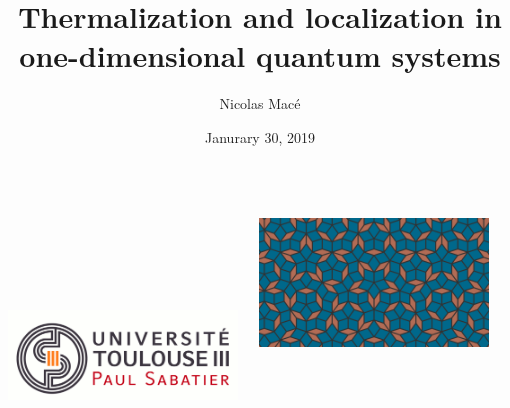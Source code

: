 \begin{frame}
\title{Thermalization and localization in one-dimensional quantum systems}

\author{Nicolas Macé}

\date{Janurary 30, 2019}

\titlepage

\btVFill
\begin{columns}
\begin{column}{2cm}
~\\
~\\
~\\
~\\
\raggedright
\includegraphics[scale=.15]{img/title/logo-ups.png}
\end{column}
\begin{column}{6cm}
\centering
\includegraphics[width=.8\textwidth]{img/title/cover.png}
\end{column}
\begin{column}{2cm}
~\\
~\\
~\\
~\\
\raggedleft

\end{column}
\end{columns}
\end{frame}
